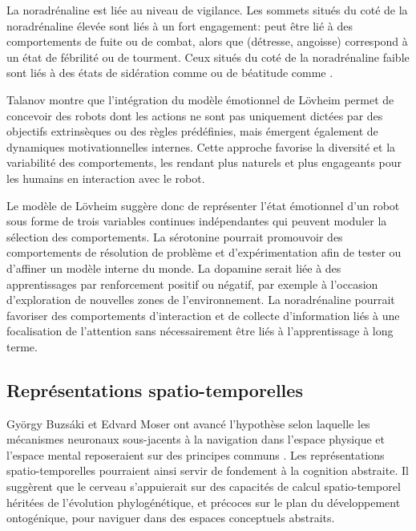 La noradrénaline est liée au niveau de vigilance. 
Les sommets situés du coté de la noradrénaline élevée sont liés à un fort engagement:  peut être lié à des comportements de fuite ou de combat, alors que  (détresse, angoisse) correspond à un état de fébrilité ou de tourment.
Ceux situés du coté de la noradrénaline faible sont liés à des états de sidération comme  ou de béatitude comme . 

Talanov montre que l’intégration du modèle émotionnel de Lövheim permet de concevoir des robots dont les actions ne sont pas uniquement dictées par des objectifs extrinsèques ou des règles prédéfinies, mais émergent également de dynamiques motivationnelles internes. 
Cette approche favorise la diversité et la variabilité des comportements, les rendant plus naturels et plus engageants pour les humains en interaction avec le robot.

Le modèle de Lövheim suggère donc de représenter l'état émotionnel d'un robot sous forme de trois variables continues indépendantes qui peuvent moduler la sélection des comportements. 
La sérotonine pourrait promouvoir des comportements de résolution de problème et d'expérimentation afin de tester ou d'affiner un modèle interne du monde. 
La dopamine serait liée à des apprentissages par renforcement positif ou négatif, par exemple à l'occasion d'exploration de nouvelles zones de l'environnement. 
La noradrénaline pourrait favoriser des comportements d'interaction et de collecte d'information liés à une focalisation de l'attention sans nécessairement être liés à l'apprentissage à long terme. 


\subsection{Représentations spatio-temporelles}

\noindent
György Buzsáki et Edvard Moser ont avancé l’hypothèse selon laquelle les mécanismes neuronaux sous-jacents à la navigation dans l’espace physique et l'espace mental reposeraient sur des principes communs \cite{buzsaki_memory_2013}.
Les représentations spatio-temporelles pourraient ainsi servir de fondement à la cognition abstraite. 
Il suggèrent que le cerveau s'appuierait sur des capacités de calcul spatio-temporel héritées de l'évolution phylogénétique, et précoces sur le plan du développement ontogénique, pour naviguer dans des espaces conceptuels abstraits.  


